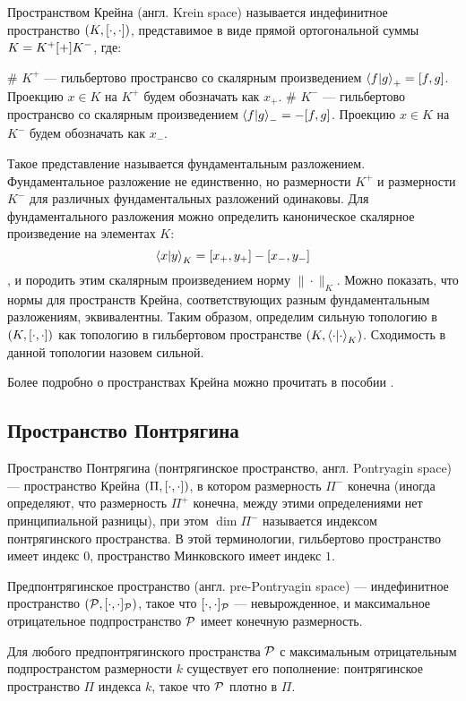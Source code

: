 Пространством Крейна (англ. Krein space) называется индефинитное пространство $(K, [\cdot,\cdot])$, представимое в виде прямой ортогональной суммы $K = K^+ [+] K^-$, где:
\begin{ilist}
# $K^+$ — гильбертово пространсво со скалярным произведением $\ip{f}{g}_+ = \iip{f}{g}$. Проекцию $x \in K$ на $K^+$ будем обозначать как $x_+$.
# $K^-$ — гильбертово пространсво со скалярным произведением $\ip{f}{g}_- = -\iip{f}{g}$. Проекцию $x \in K$ на $K^-$ будем обозначать как $x_-$.
\end{ilist}
Такое представление называется фундаментальным разложением. Фундаментальное разложение не единственно, но размерности $K^+$ и размерности $K^-$ для различных фундаментальных разложений одинаковы. Для фундаментального разложения можно определить каноническое скалярное произведение на элементах $K$:
\[
\ip{x}{y}_K = \iip{x_+}{y_+} - \iip{x_-}{y_-}
\]
, и породить этим скалярным произведением норму $\|\cdot\|_K$. Можно показать, что нормы для пространств Крейна, соответствующих разным фундаментальным разложениям, эквивалентны. Таким образом, определим сильную топологию в $(K, [\cdot,\cdot])$ как топологию в гильбертовом пространстве $(K, \ipcdot_K)$. Сходимость в данной топологии назовем сильной.

Более подробно о пространствах Крейна можно прочитать в пособии \cite{azizov_krein}.
\subsection{Пространство Понтрягина}
Пространство Понтрягина (понтрягинское пространство, англ. Pontryagin space) — пространство Крейна $(\Pi, [\cdot,\cdot])$, в котором размерность $\Pi^-$ конечна (иногда определяют, что размерность $\Pi^+$ конечна, между этими определениями нет принципиальной разницы), при этом $\dim \Pi^-$ называется индексом понтрягинского пространства. В этой терминологии, гильбертово пространство имеет индекс $0$, пространство Минковского имеет индекс $1$.

Предпонтрягинское пространство (англ. pre-Pontryagin space) — индефинитное пространство $(\mathcal{P}, [\cdot,\cdot]_{\mathcal{P}})$, такое что $[\cdot,\cdot]_{\mathcal{P}}$ — невырожденное, и максимальное отрицательное подпространство $\mathcal{P}$ имеет конечную размерность.

Для любого предпонтрягинского пространства $\mathcal{P}$ с максимальным отрицательным подпространстом размерности $k$ существует его пополнение: понтрягинское пространство $\Pi$ индекса $k$, такое что $\mathcal{P}$ плотно в $\Pi$.

